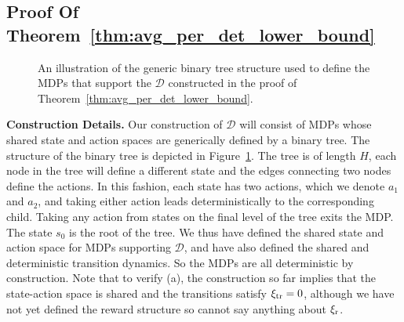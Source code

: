 \documentclass[11pt,twoside]{article}
\begin{document}
\subsection{Proof Of Theorem~\ref{thm:avg_per_det_lower_bound}}
\label{app:lower_thm}

\begin{figure}[!tbp]
\centering
{}
\caption{An illustration of the generic binary tree structure used to define the MDPs that support the $\mathcal{D}$ constructed in the proof of Theorem~\ref{thm:avg_per_det_lower_bound}.}
\label{fig:lower_det}
\end{figure}

\textbf{Construction Details.} Our construction of $\mathcal{D}$ will consist of MDPs whose shared state and action spaces are generically defined by a binary tree. The structure of the binary tree is depicted in Figure~\ref{fig:lower_det}. The tree is of length $H$, each node in the tree will define a different state and the edges connecting two nodes define the actions. In this fashion, each state has two actions, which we denote $a_1$ and $a_2$, and taking either action leads deterministically to the corresponding child. Taking any action from states on the final level of the tree exits the MDP. The state $s_0$ is the root of the tree. We thus have defined the shared state and action space for MDPs supporting $\mathcal{D}$, and have also defined the shared and deterministic transition dynamics. So the MDPs are all deterministic by construction. Note that to verify \weakprox{} (a), the construction so far implies that the state-action space is shared and the transitions satisfy $\operatorname{\xi_{tr}} = 0$, although we have not yet defined the reward structure so cannot say anything about $\operatorname{\xi_r}$. \\
\end{document}
